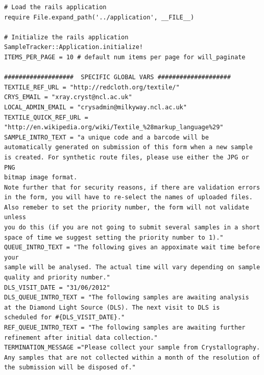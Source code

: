 \documentclass[12pt,twoside]{article}
\begin{document}
\small
\begin{verbatim}
# Load the rails application
require File.expand_path('../application', __FILE__)

# Initialize the rails application
SampleTracker::Application.initialize!
ITEMS_PER_PAGE = 10 # default num items per page for will_paginate

###################  SPECIFIC GLOBAL VARS ####################
TEXTILE_REF_URL = "http://redcloth.org/textile/"
CRYS_EMAIL = "xray.cryst@ncl.ac.uk"
LOCAL_ADMIN_EMAIL = "crysadmin@milkyway.ncl.ac.uk"
TEXTILE_QUICK_REF_URL = "http://en.wikipedia.org/wiki/Textile_%28markup_language%29"
SAMPLE_INTRO_TEXT = "a unique code and a barcode will be
automatically generated on submission of this form when a new sample
is created. For synthetic route files, please use either the JPG or PNG
bitmap image format.
Note further that for security reasons, if there are validation errors
in the form, you will have to re-select the names of uploaded files.
Also remeber to set the priority number, the form will not validate unless
you do this (if you are not going to submit several samples in a short
space of time we suggest setting the priority number to 1)."
QUEUE_INTRO_TEXT = "The following gives an appoximate wait time before your
sample will be analysed. The actual time will vary depending on sample
quality and priority number."
DLS_VISIT_DATE = "31/06/2012"
DLS_QUEUE_INTRO_TEXT = "The following samples are awaiting analysis
at the Diamond Light Source (DLS). The next visit to DLS is
scheduled for #{DLS_VISIT_DATE}."
REF_QUEUE_INTRO_TEXT = "The following samples are awaiting further 
refinement after initial data collection."
TERMINATION_MESSAGE ="Please collect your sample from Crystallography.
Any samples that are not collected within a month of the resolution of
the submission will be disposed of."
\end{verbatim}
\normalsize
\end{document}
